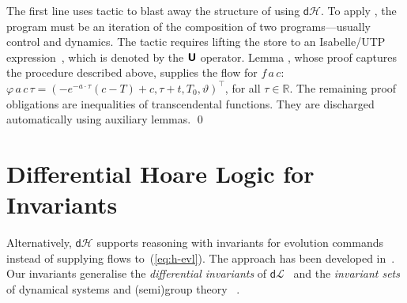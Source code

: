 \documentclass[envcountsame,envcountsect]{llncs}
\newcommand{\dL}{\mathsf{d}\mathcal{L}}
\newcommand{\dH}{\mathsf{d}\mathcal{H}}
\newcommand{\flow}{\varphi}
\newcommand{\reals}{\mathbb{R}}
\newcommand{\isactrlU}{\textbf{\textsf{U}}}
\begin{document}
\begin{example}
\noindent The first line uses tactic  to blast away the
structure of  using $\dH$. To apply , the
program must be an iteration of the composition of two
programs---usually control and dynamics. The tactic requires lifting
the store to an Isabelle/UTP expression~\cite{FosterZW16}, which is
denoted by the $\isactrlU$ operator. Lemma ,
whose proof captures the procedure described above, supplies the flow
for $f\, a\, c$:
$\flow\, a\, c\, \tau = (-e^{-a\cdot\tau}(c-T)+c, \tau+t, T_0,
\vartheta)^\top$,
for all $\tau\in\reals$. The remaining proof obligations are
inequalities of transcendental functions. They are discharged
automatically using auxiliary lemmas. \qed
\end{example}



\section{Differential Hoare Logic for Invariants}\label{sec:hoare-inv}

Alternatively, $\dH$ supports reasoning with invariants for evolution
commands instead of supplying flows to~(\ref{eq:h-evl}).  The approach
has been developed in~\cite{MuniveS19}. Our invariants generalise the
\emph{differential invariants} of $\dL$~\cite{Platzer18} and the
\emph{invariant sets} of dynamical systems and (semi)group
theory~\cite{Teschl12} .
\end{document}
